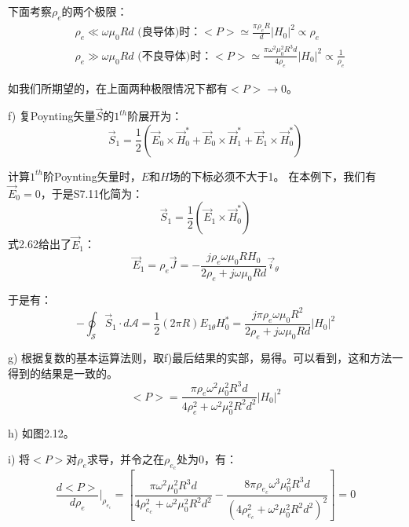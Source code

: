下面考察$\rho_e$的两个极限：
\begin{align}
&\rho_e \ll \omega \mu_0 R d\mbox{ (良导体)时：}<P>\simeq \frac{\pi \rho_e R}{d}|H_0|^2\propto \rho_e\nonumber\tag{S7.10a}\\
&\rho_e \gg \omega \mu_0 R d\mbox{ (不良导体)时：}<P>\simeq \frac{\pi \omega^2 \mu_0^2 R^3 d}{4\rho_e}|H_0|^2\propto \frac{1}{\rho_e}\nonumber\tag{S7.10b}
\end{align}

如我们所期望的，在上面两种极限情况下都有$<P>\rightarrow 0$。

f) 复Poynting矢量$\vec{S}$的$1^{th}$阶展开为：
\begin{equation*}
\vec{S}_1=\frac{1}{2}(\vec{E}_0 \times \vec{H}_0^*+\vec{E}_0 \times \vec{H}_1^*+\vec{E}_1 \times \vec{H}_0^*) \tag{S7.11}
\end{equation*}

计算$1^{th}$阶Poynting矢量时，$E$和$H$场的下标必须不大于1。
在本例下，我们有$\vec{E}_0=0$，于是S7.11化简为：
\begin{equation*}
\vec{S}_1=\frac{1}{2}(\vec{E}_1 \times \vec{H}_0^*) \tag{S7.12}
\end{equation*}
式2.62给出了$\vec{E}_1$：
\begin{equation*}
\vec{E}_1=\rho_e \vec{J}=-\frac{j\rho_e \omega \mu_0 R H_0}{2\rho_e+j\omega \mu_0 R d}\vec{i}_\theta \tag{S7.13}
\end{equation*}

于是有：
\begin{equation*}
-\oint_{\mathcal{S}}\vec{S}_1 \cdot d\mathcal{A}=\frac{1}{2}(2\pi R)E_{1\theta} H_0^*=\frac{j\pi\rho_e \omega \mu_0 R^2}{2\rho_e+j\omega \mu_0 R d} |H_0|^2 \tag{2.64}
\end{equation*}

g) 根据复数的基本运算法则，取f)最后结果的实部，易得。可以看到，这和方法一得到的结果是一致的。
\begin{equation*}
<P>=\frac{\pi \rho_e \omega^2 \mu_0^2 R^3 d}{4\rho_e^2+\omega^2 \mu_0^2 R^2 d^2}|H_0|^2 \tag{S7.14}
\end{equation*}

h) 如图2.12。

i) 将$<P>$对$\rho_e$求导，并令之在$\rho_{e_c}$处为0，有：
\begin{equation*}
\frac{d<P>}{d\rho_e} |_{\rho_{e_c}}=\left[\frac{\pi \omega^2 \mu_0^2 R^3 d}{4\rho_{e_c}^2+\omega^2 \mu_0^2 R^2 d^2}-\frac{8\pi \rho_{e_c} \omega^3 \mu_0^2 R^3 d}{(4\rho_{e_c}^2+\omega^2 \mu_0^2 R^2 d^2)^2}\right]=0 \tag{S7.15}
\end{equation*}


